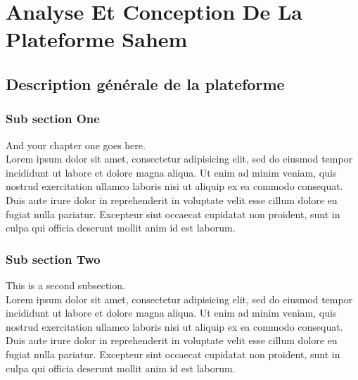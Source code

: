 

\chapter{Analyse Et Conception De La Plateforme Sahem}%
\label{chap:chapter_one}

\section{Description générale de la plateforme}

\subsection{Sub section One}

And your chapter one goes here\cite{web001}\@. ~\\
Lorem ipsum dolor sit amet, consectetur adipisicing elit, sed do eiusmod
tempor incididunt ut labore et dolore magna aliqua. Ut enim ad minim veniam,
quis nostrud exercitation ullamco laboris nisi ut aliquip ex ea commodo
consequat. Duis aute irure dolor in reprehenderit in voluptate velit esse
cillum dolore eu fugiat nulla pariatur. Excepteur sint occaecat cupidatat non
proident, sunt in culpa qui officia deserunt mollit anim id est laborum.



\subsection{Sub section Two}

This is a second subsection\cite{bazerman1988shaping}. ~\\
Lorem ipsum dolor sit amet, consectetur adipisicing elit, sed do eiusmod
tempor incididunt ut labore et dolore magna aliqua. Ut enim ad minim veniam,
quis nostrud exercitation ullamco laboris nisi ut aliquip ex ea commodo
consequat. Duis aute irure dolor in reprehenderit in voluptate velit esse
cillum dolore eu fugiat nulla pariatur. Excepteur sint occaecat cupidatat non
proident, sunt in culpa qui officia deserunt mollit anim id est laborum.

